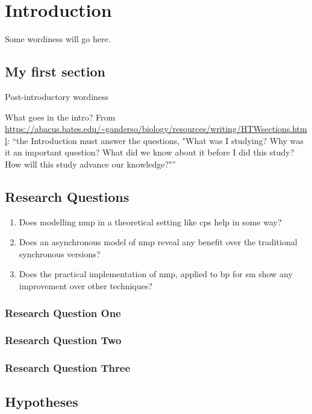 \chapter{Introduction}
Some wordiness will go here.

\section{My first section}
Post-introductory wordiness

\begin{anfxwarning}{What goes in the intro?}
From \url{https://abacus.bates.edu/~ganderso/biology/resources/writing/HTWsections.html}:  ``the Introduction must answer the questions, "What was I studying? Why was it an important question? What did we know about it before I did this study? How will this study advance our knowledge?"''
\end{anfxwarning}

\section{Research Questions}
\begin{enumerate}
    \item Does modelling \gls{nmp} in a theoretical setting like \gls{cps} help in some way?
    \item Does an asynchronous model of \gls{nmp} reveal any benefit over the traditional synchronous versions?
    \item Does the practical implementation of \gls{nmp}, applied to \gls{bp} for \gls{sm} show any improvement over other techniques?
\end{enumerate}

\subsection{Research Question One}

\subsection{Research Question Two}

\subsection{Research Question Three}

\section{Hypotheses}

